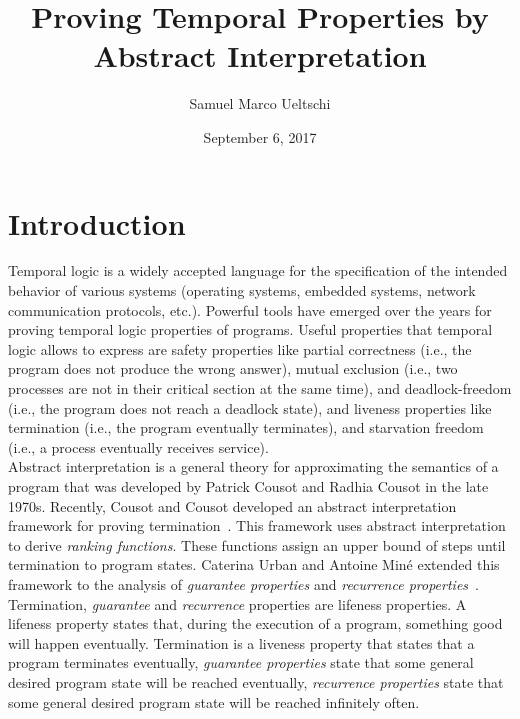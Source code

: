 \documentclass[11pt,a4paper,titlepage]{article}
\title{Proving Temporal Properties by Abstract Interpretation}
\date{September 6, 2017}
\author{Samuel Marco Ueltschi}
\theoremstyle{definition}
\begin{document}
\maketitle

\tableofcontents
\clearpage

\section{Introduction}
 
Temporal logic is a widely accepted language for the specification of the intended behavior of various systems 
(operating systems, embedded systems, network communication protocols, etc.). 
Powerful tools have emerged over the years for proving temporal logic properties of programs.
Useful properties that temporal logic allows to express are safety properties like partial correctness (i.e., the program does not produce the wrong answer), 
mutual exclusion (i.e., two processes are not in their critical section at the same time), 
and deadlock-freedom (i.e., the program does not reach a deadlock state), 
and liveness properties like termination (i.e., the program eventually terminates), 
and starvation freedom (i.e., a process eventually receives service).\\

Abstract interpretation is a general theory for approximating the semantics of a program that was 
developed by Patrick Cousot and Radhia Cousot in the late 1970s. 
Recently, Cousot and Cousot developed an abstract interpretation framework for proving termination~\cite{CousotCousot-POPL12}. 
This framework uses abstract interpretation to derive \emph{ranking functions}. These functions assign an upper bound of steps until termination
to program states. Caterina Urban and Antoine Miné extended this framework to the analysis of 
\emph{guarantee properties} and \emph{recurrence properties}~\cite{UrbanM-VMCAI15}.
Termination, \emph{guarantee} and \emph{recurrence} properties are lifeness properties. 
A lifeness property states that, during the execution of a program, something good will happen eventually. 
Termination is a liveness property that states that a program terminates eventually, 
\emph{guarantee properties} state that some general desired program state will be reached eventually, 
\emph{recurrence properties} state that some general desired program state will be reached infinitely often.\\
\end{document}
